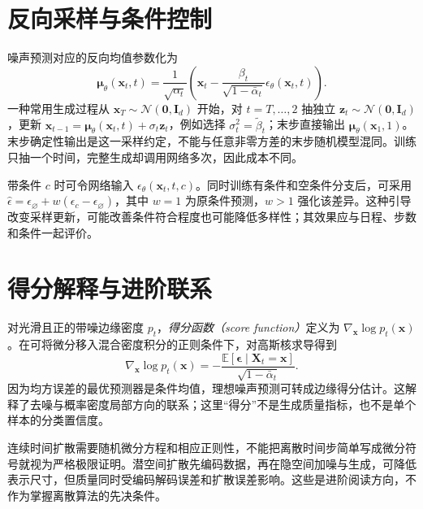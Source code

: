 \section{反向采样与条件控制}
噪声预测对应的反向均值参数化为
\begin{equation}
\boldsymbol\mu_\theta(\mathbf x_t,t)=\frac1{\sqrt{\alpha_t}}
\left(\mathbf x_t-\frac{\beta_t}{\sqrt{1-\bar\alpha_t}}\epsilon_\theta(\mathbf x_t,t)\right).
\label{eq:dl-diffusion-reverse}
\end{equation}
一种常用生成过程从 $\mathbf x_T\sim\mathcal N(\mathbf0,\mathbf I_d)$ 开始，对 $t=T,\ldots,2$ 抽独立 $\mathbf z_t\sim\mathcal N(\mathbf0,\mathbf I_d)$，更新 $\mathbf x_{t-1}=\boldsymbol\mu_\theta(\mathbf x_t,t)+\sigma_t\mathbf z_t$，例如选择 $\sigma_t^2=\widetilde\beta_t$；末步直接输出 $\boldsymbol\mu_\theta(\mathbf x_1,1)$。末步确定性输出是这一采样约定，不能与任意非零方差的末步随机模型混同。训练只抽一个时间，完整生成却调用网络多次，因此成本不同。

带条件 $c$ 时可令网络输入 $\epsilon_\theta(\mathbf x_t,t,c)$。同时训练有条件和空条件分支后，可采用 $\widehat\epsilon=\epsilon_{\varnothing}+w(\epsilon_c-\epsilon_{\varnothing})$，其中 $w=1$ 为原条件预测，$w>1$ 强化该差异。这种引导改变采样更新，可能改善条件符合程度也可能降低多样性；其效果应与日程、步数和条件一起评价。

\section{得分解释与进阶联系}
对光滑且正的带噪边缘密度 $p_t$，\emph{得分函数（score function）}定义为 $\nabla_{\mathbf x}\log p_t(\mathbf x)$。在可将微分移入混合密度积分的正则条件下，对高斯核求导得到
\[
\nabla_{\mathbf x}\log p_t(\mathbf x)
=-\frac{\mathbb E[\boldsymbol\epsilon\mid\mathbf X_t=\mathbf x]}{\sqrt{1-\bar\alpha_t}}.
\]
因为均方误差的最优预测器是条件均值，理想噪声预测可转成边缘得分估计。这解释了去噪与概率密度局部方向的联系；这里“得分”不是生成质量指标，也不是单个样本的分类置信度。

连续时间扩散需要随机微分方程和相应正则性，不能把离散时间步简单写成微分符号就视为严格极限证明。潜空间扩散先编码数据，再在隐空间加噪与生成，可降低表示尺寸，但质量同时受编码解码误差和扩散误差影响。这些是进阶阅读方向，不作为掌握离散算法的先决条件。

